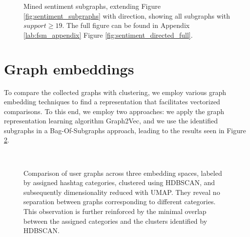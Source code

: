 \begin{figure}[h]
    \centering
    \begin{adjustwidth}{-\textwidth}{-\textwidth}
        \centering
        
    \end{adjustwidth}
    \caption{Mined sentiment subgraphs, extending Figure \ref{fig:sentiment_subgraphs} with direction, showing all subgraphs with $support \geq 19$. The full figure can be found in Appendix \ref{lab:fsm_appendix} Figure \ref{fig:sentiment_directed_full}.}
    \label{fig:sentiment_directed}
\end{figure}



\clearpage
\section{Graph embeddings}

To compare the collected graphs with clustering, we employ various graph embedding techniques to find a representation that facilitates vectorized comparisons. To this end, we employ two approaches: we apply the graph representation learning algorithm Graph2Vec, and we use the identified subgraphs in a Bag-Of-Subgraphs approach, leading to the results seen in Figure \ref{fig:emb_scatter}. 

\begin{figure}[!htbp]
    \centering
    \begin{adjustwidth}{-\textwidth}{-\textwidth}
        \centering
        \\
        
    \end{adjustwidth}
    \caption{Comparison of user graphs across three embedding spaces, labeled by assigned hashtag categories, clustered using HDBSCAN, and subsequently dimensionality reduced with UMAP. They reveal no separation between graphs corresponding to different categories. This observation is further reinforced by the minimal overlap between the assigned categories and the clusters identified by HDBSCAN.}
    \label{fig:emb_scatter}
\end{figure}

